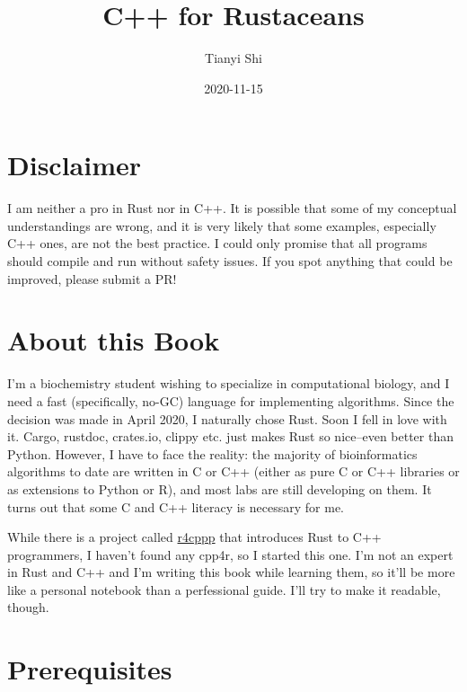 \documentclass[
]{book}
\title{C++ for Rustaceans}
\author{Tianyi Shi}
\date{2020-11-15}
\begin{document}
\maketitle

{
\setcounter{tocdepth}{1}
\tableofcontents
}
\hypertarget{disclaimer}{%
\chapter*{Disclaimer}\label{disclaimer}}

I am neither a pro in Rust nor in C++. It is possible that some of my conceptual understandings are wrong, and it is very likely that some examples, especially C++ ones, are not the best practice. I could only promise that all programs should compile and run without safety issues. If you spot anything that could be improved, please submit a PR!

\hypertarget{about-this-book}{%
\chapter*{About this Book}\label{about-this-book}}

I'm a biochemistry student wishing to specialize in computational biology, and I need a fast (specifically, no-GC) language for implementing algorithms. Since the decision was made in April 2020, I naturally chose Rust. Soon I fell in love with it. Cargo, rustdoc, crates.io, clippy etc. just makes Rust so nice--even better than Python. However, I have to face the reality: the majority of bioinformatics algorithms to date are written in C or C++ (either as pure C or C++ libraries or as extensions to Python or R), and most labs are still developing on them. It turns out that some C and C++ literacy is necessary for me.

While there is a project called \href{https://github.com/nrc/r4cppp}{r4cppp} that introduces Rust to C++ programmers, I haven't found any cpp4r, so I started this one. I'm not an expert in Rust and C++ and I'm writing this book while learning them, so it'll be more like a personal notebook than a perfessional guide. I'll try to make it readable, though.

\hypertarget{prerequisites}{%
\chapter*{Prerequisites}\label{prerequisites}}
\end{document}
